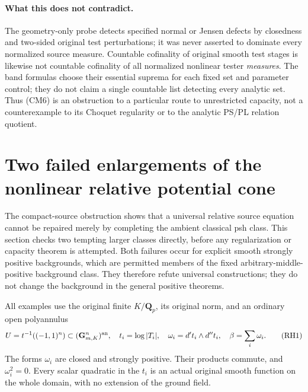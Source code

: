 \documentclass[11pt,a4paper]{article}
\numberwithin{equation}{section}
\theoremstyle{definition}
\theoremstyle{remark}
\begin{document}
\paragraph{What this does not contradict.}
The geometry-only probe detects specified normal or Jensen defects
by closedness and two-sided original test perturbations; it was
never asserted to dominate every normalized source measure.
Countable cofinality of original smooth test stages is likewise
not countable cofinality of all normalized nonlinear tester
\emph{measures}. The band formulas choose their essential
suprema for each fixed set and parameter control; they do not
claim a single countable list detecting every analytic set.
Thus (CM6) is an obstruction to a particular route to unrestricted
capacity, not a counterexample to its Choquet regularity or to
the analytic PS/PL relation quotient.



\section{Two failed enlargements of the nonlinear relative potential cone}
\label{sec:r12-relative-Hessian-cone-obstructions}

The compact-source obstruction shows that a universal relative
source equation cannot be repaired merely by completing the
ambient classical psh class.  This section checks two tempting
larger classes directly, before any regularization or capacity
theorem is attempted.  Both failures occur for explicit smooth
strongly positive backgrounds, which are permitted members of
the fixed arbitrary-middle-positive background class.  They
therefore refute universal constructions; they do not change
the background in the general positive theorems.

All examples use the original finite $K/\mathbf Q_p$, its
original norm, and an ordinary open polyannulus
\[
 U=t^{-1}((-1,1)^n)\subset(\mathbf G_{m,K}^{n})^{\rm an},
 \quad t_i=\log|T_i|,\quad
 \omega_i=d't_i\wedge d''t_i,\quad\beta=\sum_i\omega_i.
 \tag{RH1}
\]
The forms $\omega_i$ are closed and strongly positive.
Their products commute, and $\omega_i^2=0$.  Every scalar
quadratic in the $t_i$ is an actual original smooth function
on the whole domain, with no extension of the ground field.
\end{document}

